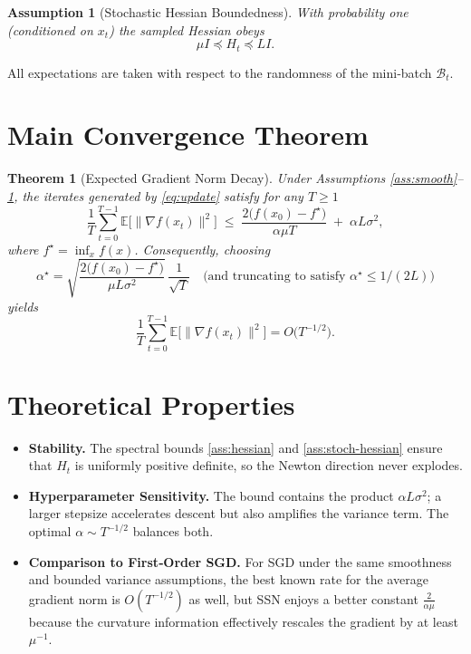 \documentclass[11pt]{article}
\newtheorem{theorem}{Theorem}
\newtheorem{assumption}{Assumption}
\newcommand{\E}{\mathbb{E}}
\begin{document}
\begin{assumption}[Stochastic Hessian Boundedness]\label{ass:stoch-hessian}
With probability one (conditioned on $x_{t}$) the sampled Hessian obeys
\[
\mu I \preceq H_{t} \preceq L I .
\]
\end{assumption}

All expectations are taken with respect to the randomness of the mini‑batch
$\mathcal{B}_{t}$.

\section*{Main Convergence Theorem}
\begin{theorem}[Expected Gradient Norm Decay]\label{thm:main}
Under Assumptions \ref{ass:smooth}--\ref{ass:stoch-hessian}, the iterates generated by
\eqref{eq:update} satisfy for any $T\ge 1$
\[
\frac{1}{T}\sum_{t=0}^{T-1}\E\big[\|\nabla f(x_{t})\|^{2}\big]
\;\le\;
\frac{2\big(f(x_{0})-f^{\star}\big)}{\alpha\mu T}
\;+\;
\alpha L\sigma^{2},
\]
where $f^{\star}= \inf_{x}f(x)$.
Consequently, choosing
\[
\alpha^{\star}= \sqrt{\frac{2\big(f(x_{0})-f^{\star}\big)}{\mu L\sigma^{2}}}\,\frac{1}{\sqrt{T}}
\quad\text{(and truncating to satisfy }\alpha^{\star}\le 1/(2L)\text{)}
\]
yields
\[
\frac{1}{T}\sum_{t=0}^{T-1}\E\big[\|\nabla f(x_{t})\|^{2}\big]=O\!\big(T^{-1/2}\big).
\]
\end{theorem}

\section*{Theoretical Properties}
\begin{itemize}
\item \textbf{Stability.} The spectral bounds \eqref{ass:hessian} and
\eqref{ass:stoch-hessian} ensure that $H_{t}$ is uniformly positive definite,
so the Newton direction never explodes.
\item \textbf{Hyperparameter Sensitivity.} The bound contains the product
$\alpha L\sigma^{2}$; a larger stepsize accelerates descent but also amplifies
the variance term. The optimal $\alpha\sim T^{-1/2}$ balances both.
\item \textbf{Comparison to First‑Order SGD.}
For SGD under the same smoothness and bounded variance assumptions,
the best known rate for the average gradient norm is $O(T^{-1/2})$ as well,
but SSN enjoys a better constant $\frac{2}{\alpha\mu}$ because the curvature
information effectively rescales the gradient by at least $\mu^{-1}$.
\end{itemize}
\end{document}
